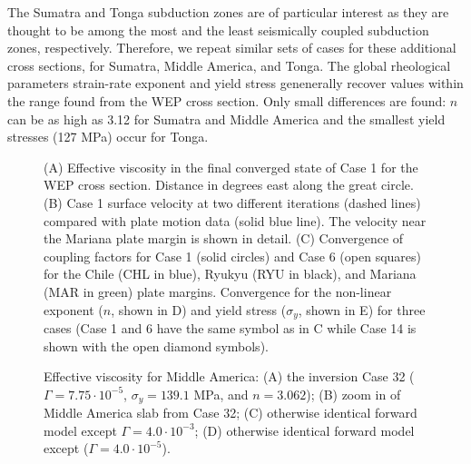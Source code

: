 \documentclass[12pt]{article}
\begin{document}
{The Sumatra and Tonga subduction zones are of particular interest as they are thought to be among the most and the least seismically coupled subduction zones, respectively.
Therefore, we repeat similar sets of cases for these additional cross sections, for Sumatra, Middle America, and Tonga.
The global rheological parameters strain-rate exponent and yield stress genenerally recover values within the range found from the WEP cross section. Only small differences are found: $n$ can be as high as 3.12 for Sumatra and Middle America and the smallest yield stresses (127 MPa) occur for Tonga.



\begin{figure}[H]
\centering

\hspace{-0.2cm}

\caption{
(A) Effective viscosity in the final converged state of Case 1 for the WEP cross section. Distance in degrees east along the great circle.
(B) Case 1 surface velocity at two different iterations (dashed lines) compared with plate motion data (solid blue line). The velocity near the Mariana plate margin is shown in detail.
(C) Convergence of coupling factors  for Case 1 (solid circles) and Case 6 (open squares) for the Chile (CHL in blue), Ryukyu (RYU in black), and Mariana (MAR in green) plate margins. 
Convergence for the non-linear exponent ($n$, shown in D)  and yield stress ($\sigma_y$, shown in E) for three cases (Case 1 and 6 have the same symbol as in C while Case 14 is shown with the open diamond symbols).
}
\label{fig:inverse1}
\end{figure}


\begin{figure}[H]
\centering

\hspace{-1.0cm}

\caption{Effective viscosity for Middle America: (A) the inversion Case 32 ($\Gamma = 7.75 \cdot 10^{-5}$, $\sigma_y = 139.1$ MPa, and $n = 3.062$);  (B) zoom in of Middle America slab from Case 32; (C) otherwise identical forward model except $\Gamma = 4.0 \cdot 10^{-3}$;
(D) otherwise identical forward model except ($\Gamma = 4.0 \cdot 10^{-5}$).}
\label{fig:middle_physics}
\end{figure}


}
\end{document}
